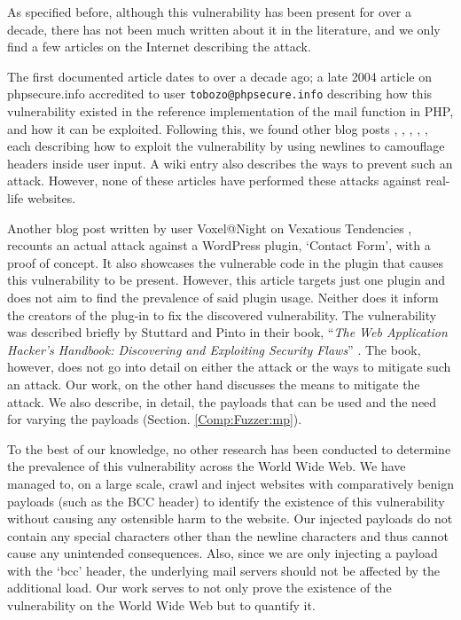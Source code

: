As specified before, although this vulnerability has been present for over a decade, there has not been much written about it in the literature, and we only find a few articles on the Internet describing the attack.

The first documented article dates to over a decade ago; a late 2004 article on phpsecure.info \cite{Tobozo} accredited to user \lstinline|tobozo@phpsecure.info| describing how this vulnerability existed in the reference implementation of the mail function in PHP, and how it can be exploited. Following this, we found other blog posts \cite{Calin}, \cite{DK}, \cite{Injection2}, \cite{Nicol}, \cite{Pope}, each describing how to exploit the vulnerability by using newlines to camouflage headers inside user input. A wiki entry \cite{Injection} also describes the ways to prevent such an attack. However, none of these articles have performed these attacks against real-life websites.

Another blog post written by user Voxel@Night on Vexatious Tendencies \cite{Tendencies2014}, recounts an actual attack against a WordPress plugin, `Contact Form', with a proof of concept\footnotemark. It also showcases the vulnerable code in the plugin that causes this vulnerability to be present. However, this article targets just one plugin and does not aim to find the prevalence of said plugin usage. Neither does it inform the creators of the plug-in to fix the discovered vulnerability.
The vulnerability was described briefly by Stuttard and Pinto in their book, ``\emph{The Web Application Hacker's Handbook: Discovering and Exploiting Security Flaws}'' \cite{stuttard2011web}. The book, however, does not go into detail on either the attack or the ways to mitigate such an attack. Our work, on the other hand discusses the means to mitigate the attack. We also describe, in detail, the payloads that can be used and the need for varying the payloads (Section. \ref{Comp:Fuzzer:mp}).

To the best of our knowledge, no other research has been conducted to determine the prevalence of this vulnerability across the World Wide Web. We have managed to, on a large scale, crawl and inject websites with comparatively benign payloads (such as the BCC header) to identify the existence of this vulnerability without causing any ostensible harm to the website. Our injected payloads do not contain any special characters other than the newline characters and thus cannot cause any unintended consequences. Also, since we are only injecting a payload with the `bcc' header, the underlying mail servers should not be affected by the additional load. Our work serves to not only prove the existence of the vulnerability on the World Wide Web but to quantify it.

